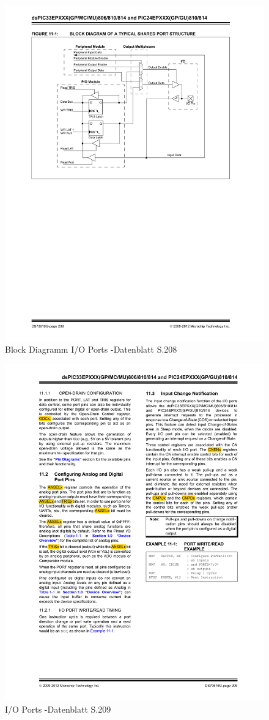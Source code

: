 \begin{figure}[h]
	\centering
	\includegraphics[width=\textwidth]{Images/page208}
	\caption[Block Diagramm I/O Ports]{Block Diagramm I/O Ports -Datenblatt S.208}
	\label{image:page208}
\end{figure}	

\begin{figure}[h]
	\centering
	\includegraphics[width=\textwidth]{Images/page209}
	\caption[I/O Ports]{I/O Ports -Datenblatt S.209}
	\label{image:page209}
\end{figure}